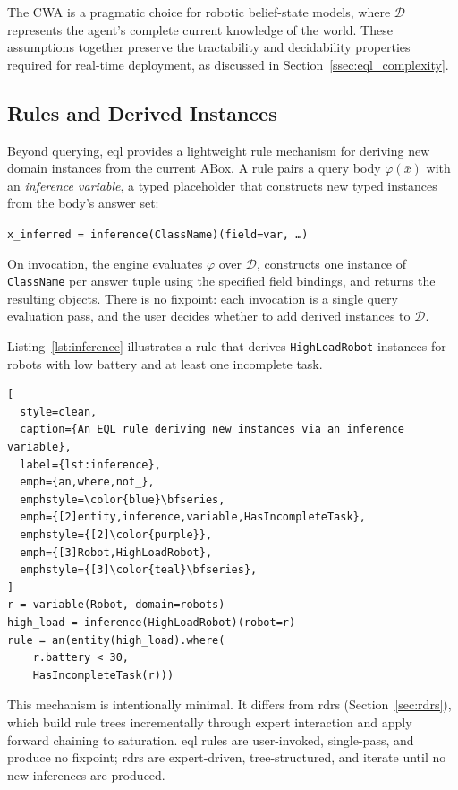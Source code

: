 \documentclass[a4paper,fleqn]{cas-sc}
\begin{document}
The CWA is a pragmatic choice for robotic belief-state models, where $\mathcal{D}$ represents the agent's complete current knowledge of the world. These assumptions together preserve the tractability and decidability
properties required for real-time deployment, as discussed in
Section~\ref{ssec:eql_complexity}.


\subsection{Rules and Derived Instances}
\label{ssec:eql_rules}

Beyond querying, \ac{eql} provides a lightweight rule mechanism for deriving
new domain instances from the current ABox. A rule pairs a query body
$\varphi(\bar{x})$ with an \emph{inference variable}, a typed placeholder
that constructs new typed instances from the body's answer set:
%
\begin{center}
  \texttt{x\_inferred = inference(ClassName)(field=var, \ldots)}
\end{center}
%
On invocation, the engine evaluates $\varphi$ over $\mathcal{D}$, constructs
one instance of \texttt{ClassName} per answer tuple using the specified field
bindings, and returns the resulting objects. There is no fixpoint: each
invocation is a single query evaluation pass, and the user decides whether to
add derived instances to $\mathcal{D}$.

Listing~\ref{lst:inference} illustrates a rule that derives
\texttt{HighLoadRobot} instances for robots with low battery and at least one
incomplete task.

\begin{lstlisting}[
  style=clean,
  caption={An EQL rule deriving new instances via an inference variable},
  label={lst:inference},
  emph={an,where,not_},
  emphstyle=\color{blue}\bfseries,
  emph={[2]entity,inference,variable,HasIncompleteTask},
  emphstyle={[2]\color{purple}},
  emph={[3]Robot,HighLoadRobot},
  emphstyle={[3]\color{teal}\bfseries},
]
r = variable(Robot, domain=robots)
high_load = inference(HighLoadRobot)(robot=r)
rule = an(entity(high_load).where(
    r.battery < 30,
    HasIncompleteTask(r)))
\end{lstlisting}

This mechanism is intentionally minimal. It differs from \acp{rdr}
(Section~\ref{sec:rdrs}), which build rule trees incrementally through expert
interaction and apply forward chaining to saturation. \ac{eql} rules are
user-invoked, single-pass, and produce no fixpoint; \acp{rdr} are expert-driven,
tree-structured, and iterate until no new inferences are produced.
\end{document}
